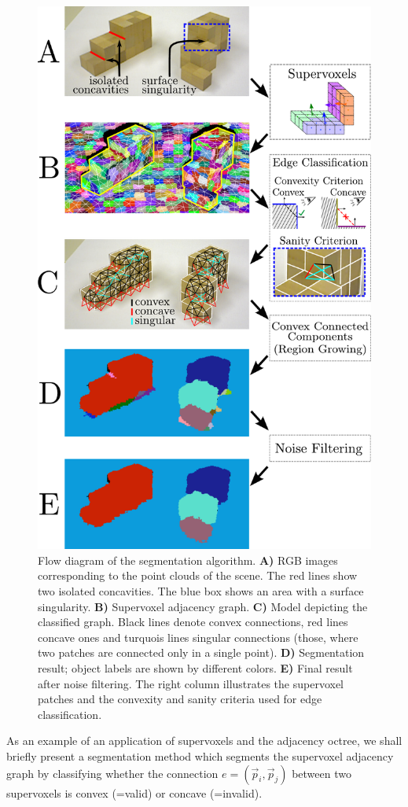 \begin{figure}[!ht]
\centering
  \includegraphics[width=0.7\linewidth]{figures/CVPR2014/flow_diagram}
    \caption[Flow Diagram of LCCP]{Flow diagram of the segmentation algorithm. \textbf{A)} RGB images corresponding to the point clouds of the scene. The red lines show two isolated concavities. The blue box shows an area with a surface singularity. \textbf{B)} Supervoxel adjacency graph. \textbf{C)} Model depicting the classified graph. Black lines denote convex connections, red lines concave ones and turquois lines singular connections (those, where two patches are connected only in a single point). \textbf{D)} Segmentation result; object labels are shown by different colors. \textbf{E)} Final result after noise filtering. The right column illustrates the supervoxel patches and the convexity and sanity criteria used for edge classification.}
  \label{fig:flow}
\end{figure}

As an example of an application of supervoxels and the adjacency octree, we shall briefly present a segmentation method which segments the supervoxel adjacency graph by classifying whether the connection $e=(\vec p_i, \vec p_j)$ between two supervoxels is convex (=valid) or concave (=invalid).

